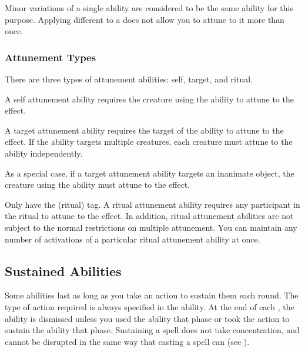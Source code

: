                 Minor variations of a single ability are considered to be the same ability for this purpose.
                Applying different  to a  does not allow you to attune to it more than once.

            \subsubsection{Attunement Types}\label{Attunement Types}
                There are three types of attunement abilities: self, target, and ritual.

                 A self attunement ability requires the creature using the ability to attune to the effect.

                 A target attunement ability requires the target of the ability to attune to the effect.
                If the ability targets multiple creatures, each creature must attune to the ability independently.

                As a special case, if a target attunement ability targets an inanimate object, the creature using the ability must attune to the effect.

                 Only  have the  (ritual) tag.
                A ritual attunement ability requires any participant in the ritual to attune to the effect.
                In addition, ritual attunement abilities are not subject to the normal restrictions on multiple attunement.
                You can maintain any number of activations of a particular ritual attunement ability at once.

        \subsection{Sustained Abilities}\label{Sustained Abilities}
            Some abilities last as long as you take an action to sustain them each round.
            The type of action required is always specified in the ability.
            At the end of each , the ability is dismissed unless you used the ability that phase or took the action to sustain the ability that phase.
            Sustaining a spell does not take concentration, and cannot be disrupted in the same way that casting a spell can (see ).

